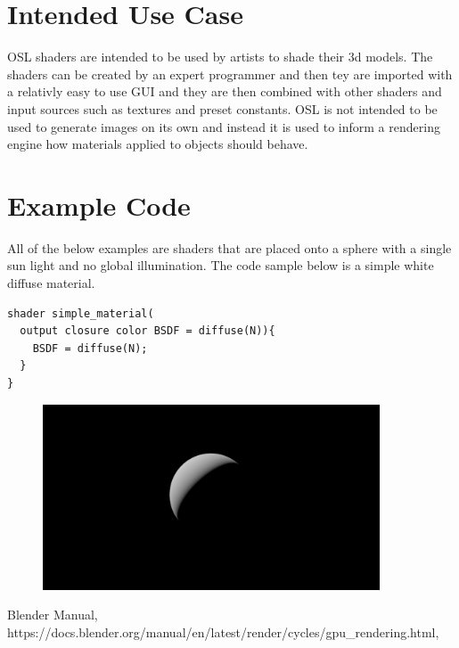 \documentclass{article}
\begin{document}
\section{Intended Use Case}
OSL shaders are intended to be used by artists to shade their 3d models. The shaders can be created by an expert programmer and then tey are imported with a relativly easy to use GUI and they are then combined with other shaders and input sources such as textures and preset constants. OSL is not intended to be used to generate images on its own and instead it is used to inform a rendering engine how materials applied to objects should behave.
\section{Example Code}
All of the below examples are shaders that are placed onto a sphere with a single sun light and no global illumination. The code sample below is a simple white diffuse material.
\begin{lstlisting}
shader simple_material(
  output closure color BSDF = diffuse(N)){
    BSDF = diffuse(N);
  }
}
\end{lstlisting}
\begin{figure}
\includegraphics[width=10cm]{hello_sphere.png}
\centering
\end{figure}

\begin{thebibliography}{9}

  Blender Manual,
  https://docs.blender.org/manual/en/latest/render/cycles/gpu\_rendering.html,

\end{thebibliography}
\end{document}
